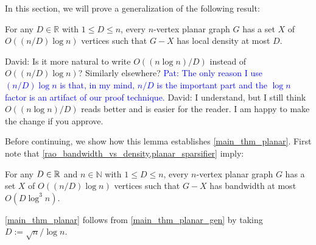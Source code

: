 \documentclass{patmorin}
\renewcommand{\le}{\leqslant}
\renewcommand{\leq}{\leqslant}
\newcommand{\david}[1]{{\color{orange} David: #1}}
\newcommand{\pat}[1]{\textcolor{Blue}{Pat: #1}}
\newcommand{\NN}{\mathbb{N}}
\begin{document}
In this section, we will prove a generalization of the following result:

\begin{lem}\label{planar_sparsifier}
  For any $D\in\mathbb{R}$ with $1\leq D\leq n$, every $n$-vertex planar graph $G$ has a set $X$ of $O((n/D)\log n)$ vertices such that $G-X$ has local density at most $D$.
\end{lem}

\david{Is it more natural to write
$O((n\log n)/D)$ instead of $O((n/D)\log n)$? Similarly elsewhere?} \pat{The only reason I use $(n/D)\log n$ is that, in my mind, $n/D$ is the important part and the $\log n$ factor is an artifact of our proof technique.} \david{I understand, but I still think $O((n\log n)/D)$ reads better and is easier for the reader. I am happy to make  the change if you approve. }

Before continuing, we show how this lemma establishes \cref{main_thm_planar}. First note that
\cref{rao_bandwidth_vs_density,planar_sparsifier} imply:

\begin{cor}
\label{main_thm_planar_gen}
    For any $D\in\mathbb{R}$ and $n\in\NN$ with $1\leq D\leq n$, every $n$-vertex planar graph $G$ has a set $X$ of $O((n/D)\log n)$ vertices such that $G-X$ has bandwidth at most $O(D\log^3 n)$.
\end{cor}

\cref{main_thm_planar} follows from \cref{main_thm_planar_gen}  by taking $D:=\sqrt{n}/\log n$.


%
%
%


\end{document}
